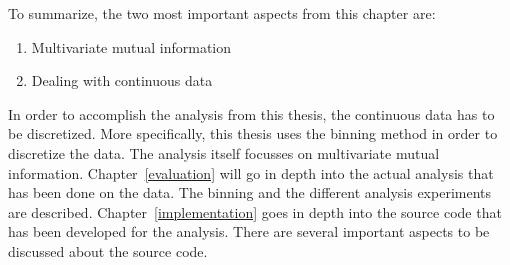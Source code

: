 To summarize, the two most important aspects from this chapter are:

\begin{enumerate}
\item Multivariate mutual information
\item Dealing with continuous data
\end{enumerate}

In order to accomplish the analysis from this thesis, the continuous data has to be discretized. More specifically, this thesis uses the binning method in order to discretize the data. The analysis itself focusses on multivariate mutual information. Chapter~\ref{evaluation} will go in depth into the actual analysis that has been done on the data. The binning and the different analysis experiments are described. Chapter~\ref{implementation} goes in depth into the source code that has been developed for the analysis. There are several important aspects to be discussed about the source code. 